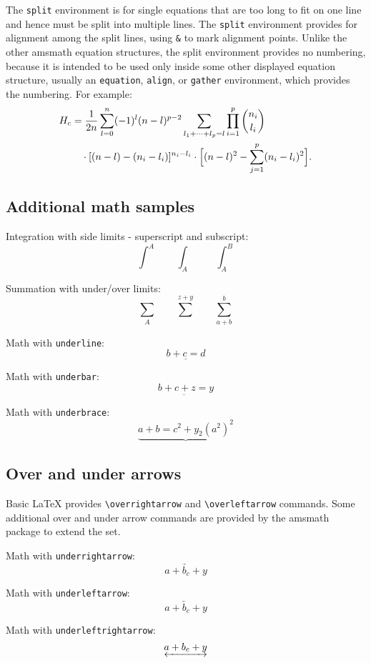 \documentclass[numbers,webpdf,imaiai]{ima-authoring-template}%
\theoremstyle{thmstyleone}%
\theoremstyle{thmstyletwo}%
\theoremstyle{thmstylethree}%
\numberwithin{equation}{section}
\begin{document}
The \verb+split+ environment is for single equations that are too long to fit on one line and hence must be split into
multiple lines. The \verb+split+ environment provides for alignment among the split lines, using \verb+&+ to mark alignment
points. Unlike the other amsmath equation structures, the split environment provides no numbering, because it is intended
to be used only inside some other displayed equation structure, usually an \verb+equation+, \verb+align+,
or \verb+gather+ environment, which provides the numbering. For example:
\begin{equation}
\begin{split}
H_{c} &= \frac{1}{2n} \sum^{n}_{l=0}(-1)^{l} (n-{l})^{p-2} \sum_{l_1+\dots+l_p=l} \prod^{p}_{i=1} \binom{n_i}{l _i}\\
&\quad\cdot[(n-l)-(n_i-l_i)]^{n_i - l_i}\cdot \Bigl[(n-l)^2 - \sum^{p}_{j=1}(n_{i} - l_{i})^2\Bigr].
\end{split}
\end{equation}

\subsection{Additional math samples}

Integration with side limits - superscript and subscript:
\[
\int^{A}\qquad \int_{A}\qquad \int_{A}^{B}
\]

Summation with under/over limits:
\[
\sum_{A}\qquad \sum^{z+y}\qquad \sum_{a+b}^{b}
\]

Math with \verb+underline+:
\[\underline{b+c=d}\]

Math with \verb+underbar+:
\[\underbar{b+c+z=y}\]

Math with \verb+underbrace+:
\[\underbrace{a+b=c^2 + y_2 (a^2)^2}\]

\subsection{Over and under arrows}

Basic LaTeX provides \verb+\overrightarrow+ and \verb+\overleftarrow+ commands. Some
additional over and under arrow commands are provided by the amsmath package to extend the set.


Math with \verb+underrightarrow+:
\[\underrightarrow{a+b_c+y}\]

Math with \verb+underleftarrow+:
\[\underleftarrow{a+b_c+y}\]

Math with \verb+underleftrightarrow+:
\[\underleftrightarrow{a+b_c+y}\]
\end{document}
